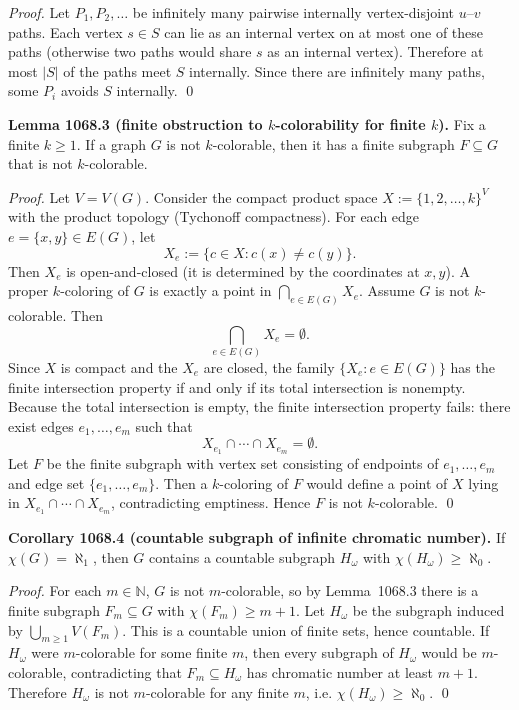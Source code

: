 \emph{Proof.}
Let $P_1,P_2,\ldots$ be infinitely many pairwise internally vertex-disjoint $u$--$v$ paths.  Each vertex $s\in S$ can lie as an internal vertex on at most one of these paths (otherwise two paths would share $s$ as an internal vertex). Therefore at most $|S|$ of the paths meet $S$ internally.  Since there are infinitely many paths, some $P_i$ avoids $S$ internally.
\qed

\textbf{Lemma 1068.3 (finite obstruction to $k$-colorability for finite $k$).}
Fix a finite $k\ge 1$.  If a graph $G$ is not $k$-colorable, then it has a finite subgraph $F\subseteq G$ that is not $k$-colorable.

\emph{Proof.}
Let $V=V(G)$. Consider the compact product space $X := \{1,2,\dots,k\}^V$ with the product topology (Tychonoff compactness).
For each edge $e=\{x,y\}\in E(G)$, let
\[
X_e := \{c\in X : c(x)\ne c(y)\}.
\]
Then $X_e$ is open-and-closed (it is determined by the coordinates at $x,y$).
A proper $k$-coloring of $G$ is exactly a point in $\bigcap_{e\in E(G)} X_e$.
Assume $G$ is not $k$-colorable. Then
\[
\bigcap_{e\in E(G)} X_e = \emptyset.
\]
Since $X$ is compact and the $X_e$ are closed, the family $\{X_e : e\in E(G)\}$ has the finite intersection property if and only if its total intersection is nonempty.
Because the total intersection is empty, the finite intersection property fails: there exist edges $e_1,\dots,e_m$ such that
\[
X_{e_1}\cap\cdots\cap X_{e_m} = \emptyset.
\]
Let $F$ be the finite subgraph with vertex set consisting of endpoints of $e_1,\dots,e_m$ and edge set $\{e_1,\dots,e_m\}$.  Then a $k$-coloring of $F$ would define a point of $X$ lying in $X_{e_1}\cap\cdots\cap X_{e_m}$, contradicting emptiness. Hence $F$ is not $k$-colorable.
\qed

\textbf{Corollary 1068.4 (countable subgraph of infinite chromatic number).}
If $\chi(G)=\aleph_1$, then $G$ contains a countable subgraph $H_\omega$ with $\chi(H_\omega)\ge \aleph_0$.

\emph{Proof.}
For each $m\in\mathbb{N}$, $G$ is not $m$-colorable, so by Lemma~1068.3 there is a finite subgraph $F_m\subseteq G$ with $\chi(F_m)\ge m+1$.
Let $H_\omega$ be the subgraph induced by $\bigcup_{m\ge 1} V(F_m)$.  This is a countable union of finite sets, hence countable.
If $H_\omega$ were $m$-colorable for some finite $m$, then every subgraph of $H_\omega$ would be $m$-colorable, contradicting that $F_m\subseteq H_\omega$ has chromatic number at least $m+1$.  Therefore $H_\omega$ is not $m$-colorable for any finite $m$, i.e. $\chi(H_\omega)\ge \aleph_0$.
\qed

